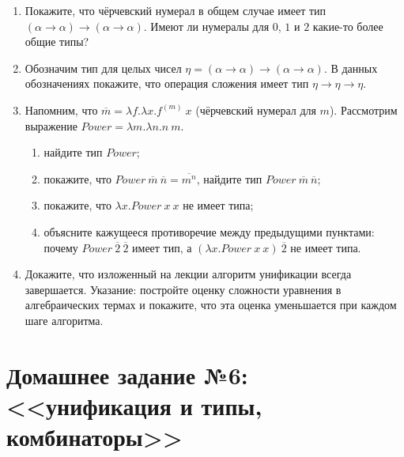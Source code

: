 \documentclass[10pt,a4paper,oneside]{article}
\begin{document}
\begin{enumerate}
\item Покажите, что чёрчевский нумерал в общем случае имеет 
тип $(\alpha\rightarrow\alpha)\rightarrow(\alpha\rightarrow\alpha)$.
Имеют ли нумералы для $0$, $1$ и $2$ какие-то более общие типы?

\item Обозначим тип для целых чисел $\eta = (\alpha\rightarrow\alpha)\rightarrow(\alpha\rightarrow\alpha)$.
В данных обозначениях покажите, что операция сложения имеет тип $\eta\rightarrow\eta\rightarrow\eta$.

\item Напомним, что $\overline{m} = \lambda f.\lambda x.f^{(m)}\ x$ (чёрчевский нумерал для $m$).
Рассмотрим выражение $Power = \lambda m.\lambda n.n\ m$.
\begin{enumerate}
\item найдите тип $Power$;
\item покажите, что $Power\ \overline{m}\ \overline{n} = \overline{m^n}$, найдите тип $Power\ \overline{m}\ \overline{n}$;
\item покажите, что $\lambda x.Power\ x\ x$ не имеет типа;
\item объясните кажущееся противоречие между предыдущими пунктами: почему 
$Power\ \overline{2}\ \overline{2}$ имеет тип, а $(\lambda x.Power\ x\ x)\ \overline{2}$ не имеет типа.
\end{enumerate}

\item Докажите, что изложенный на лекции алгоритм унификации всегда завершается.
Указание: постройте оценку сложности уравнения в алгебраических термах и покажите,
что эта оценка уменьшается при каждом шаге алгоритма.

\end{enumerate}

\section*{Домашнее задание №6: <<унификация и типы, комбинаторы>>}
\end{document}
